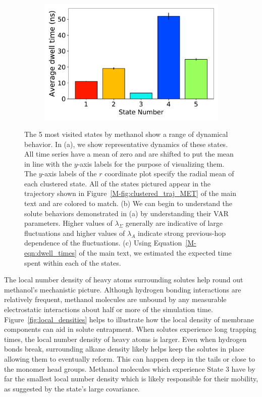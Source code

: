 \documentclass{article}
\begin{document}
\begin{figure}
\begin{subfigure}{0.41\textwidth}
  \includegraphics[width=\textwidth]{dwell_times.pdf}
  \caption{}\label{fig:dwell_times}
  \end{subfigure}
  \caption{The 5 most visited states by methanol show a range of dynamical behavior. In 
  (a), we show representative dynamics of these states. All time series have a mean of zero and are
  shifted to put the mean in line with the $y$-axis labels for the purpose of visualizing them.
  The $y$-axis labels of the $r$ coordinate plot specify the radial mean of each clustered 
  state. All of the states pictured appear in the trajectory shown in 
  Figure~\ref{M-fig:clustered_traj_MET} of the main text and are colored to match.
  (b) We can begin to understand the solute behaviors demonstrated in (a) by understanding their VAR 
  parameters. Higher values of $\lambda_{\Sigma}$ generally are indicative of large fluctuations
  and higher values of $\lambda_A$ indicate strong previous-hop dependence of the fluctuations.
  (c) Using Equation~\ref{M-eqn:dwell_times} of the main text, we estimated the expected time spent within each 
  of the states.
  }\label{fig:common_states_MET}
  \end{figure}
  
  The local number density of heavy atoms surrounding solutes help round out methanol's
  mechanistic picture. Although hydrogen bonding interactions are relatively frequent,
  methanol molecules are unbound by any measurable electrostatic interactions about 
  half or more of the simulation time. Figure~\ref{fig:local_densities} helps to 
  illustrate how the local density of membrane components can aid in solute entrapment.
  When solutes experience long trapping times, the local number density of heavy atoms
  is larger. Even when hydrogen bonds break, surrounding alkane density likely helps 
  keep the solutes in place allowing them to eventually reform. This can happen deep 
  in the tails or close to the monomer head groups. Methanol molecules which experience
  State 3 have by far the smallest local number density which is likely responsible for 
  their mobility, as suggested by the state's large covariance.
  
\end{document}
